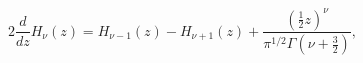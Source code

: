 \begin{equation}
2\frac{d}{dz}H_{\nu }\left(z\right)=H_{\nu -1}\left(z\right)-H_{\nu +1}\left(z\right)+\frac{\left(\frac{1}{2}z\right)^{\nu }}{\pi ^{1/2}\Gamma \left(\nu +\frac{3}{2}\right)},\end{equation}

